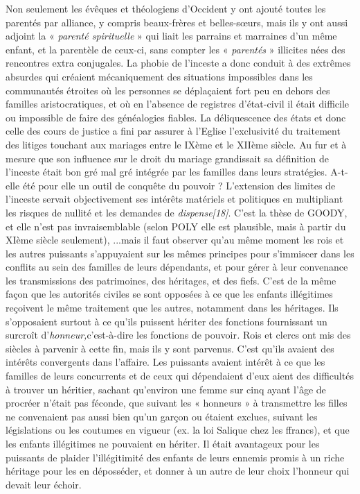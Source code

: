  Non seulement les évêques et théologiens d'Occident y ont ajouté toutes les parentés par alliance, y compris beaux-frères et belles-sœurs, mais ils y ont aussi adjoint la « \emph{parenté spirituelle} » qui liait les parrains et marraines d'un même enfant, et la parentèle de ceux-ci, sans compter les « \emph{parentés} » illicites nées des rencontres extra conjugales. La phobie de l'inceste a donc conduit à des extrêmes absurdes qui créaient mécaniquement des situations impossibles dans les communautés étroites où les personnes se déplaçaient fort peu en dehors des familles aristocratiques, et où en l'absence de registres d'état-civil il était difficile ou impossible de faire des généalogies fiables. 
 La déliquescence des états et donc celle des cours de justice a fini par assurer à l'Eglise l'exclusivité du traitement des litiges touchant aux mariages entre le IXème et le XIIème siècle. Au fur et à mesure que son influence sur le droit du mariage grandissait sa définition de l'inceste était bon gré mal gré intégrée par les familles dans leurs stratégies. A-t-elle été pour elle un outil de conquête du pouvoir ? L'extension des limites de l'inceste servait objectivement ses intérêts matériels et politiques en multipliant les risques de nullité et les demandes de \emph{dispense[18]}. C'est la thèse de GOODY, et elle n'est pas invraisemblable (selon POLY elle est plausible, mais à partir du XIème siècle seulement),
 ...mais il faut observer qu'au même moment les rois et les autres puissants s'appuyaient sur les mêmes principes pour s'immiscer dans les conflits au sein des familles de leurs dépendants, et pour gérer à leur convenance les transmissions des patrimoines, des héritages, et des fiefs. 
 C'est de la même façon que les autorités civiles se sont opposées à ce que les enfants illégitimes reçoivent le même traitement que les autres, notamment dans les héritages. Ils s'opposaient surtout à ce qu'ils puissent hériter des fonctions fournissant un surcroît d'\emph{honneur,}c'est-à-dire les fonctions de pouvoir\emph{.} Rois et clercs ont mis des siècles à parvenir à cette fin, mais ils y sont parvenus. C'est qu'ils avaient des intérêts convergents dans l'affaire. Les puissants avaient intérêt à ce que les familles de leurs concurrents et de ceux qui dépendaient d'eux aient des difficultés à trouver un héritier, sachant qu'environ une femme sur cinq ayant l'âge de procréer n'était pas féconde, que suivant les « honneurs » à transmettre les filles ne convenaient pas aussi bien qu'un garçon ou étaient exclues, suivant les législations ou les coutumes en vigueur (ex. la loi Salique chez les ffrancs), et que les enfants illégitimes ne pouvaient en hériter. Il était avantageux pour les puissants de plaider l'illégitimité des enfants de leurs ennemis promis à un riche héritage pour les en déposséder, et donner à un autre de leur choix l'honneur qui devait leur échoir. 
